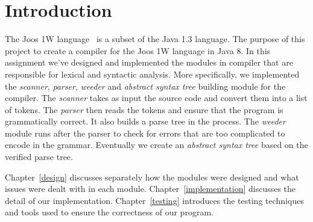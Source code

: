 \chapter{Introduction}

The Joos 1W language~\cite{joos1w} is a subset of the Java 1.3 language. The purpose of this project to create a compiler for the Joos 1W language in Java 8. In this assignment we've designed and implemented the modules in compiler that are responsible for lexical and syntactic analysis. More specifically, we implemented the \emph{scanner}, \emph{parser}, \emph{weeder} and \emph{abstract syntax tree} building module for the compiler. The \emph{scanner} takes as input the source code and convert them into a list of tokens. The \emph{parser} then reads the tokens and ensure that the program is grammatically correct. It also builds a parse tree in the process. The \emph{weeder} module runs after the parser to check for errors that are too complicated to encode in the grammar. Eventually we create an \emph{abstract syntax tree} based on the verified parse tree.

Chapter~\ref{design} discusses separately how the modules were designed and what issues were dealt with in each module. Chapter~\ref{implementation} discusses the detail of our implementation. Chapter~\ref{testing} introduces the testing techniques and tools used to ensure the correctness of our program.